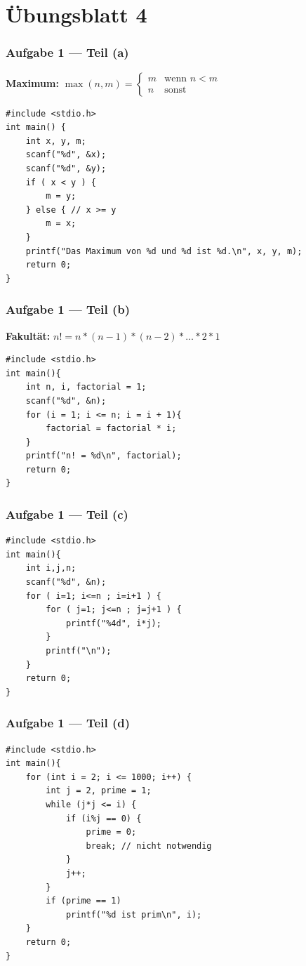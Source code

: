 \documentclass{beamer}
\newcommand*{\ttfamilywithbold}{\fontfamily{lmtt}\selectfont}
\begin{document}

\section{Übungsblatt 4}

\begin{frame}[fragile] \frametitle{Aufgabe 1 --- Teil (a)}
	\textbf{Maximum:} $\displaystyle \max(n,m) = \begin{cases}
		m & \text{wenn } n < m \\
		n & \text{sonst}
	\end{cases}$ \pause
	
	\vspace{\baselineskip}
	
	\begin{lstlisting}[style=frame, basicstyle=\ttfamilywithbold\footnotesize]
#include <stdio.h>
int main() {
	int x, y, m;
	scanf("%d", &x);
	scanf("%d", &y);
	if ( x < y ) {
		m = y;
	} else { // x >= y
		m = x;
	}
	printf("Das Maximum von %d und %d ist %d.\n", x, y, m);
	return 0;
}
	\end{lstlisting}
\end{frame}

\begin{frame}[fragile] \frametitle{Aufgabe 1 --- Teil (b)}
	\textbf{Fakultät:} $\displaystyle n! = n * (n-1) * (n-2) * \dots * 2 * 1$ \pause
	
\begin{lstlisting}[style=frame]
#include <stdio.h>
int main(){
	int n, i, factorial = 1;
	scanf("%d", &n);
	for (i = 1; i <= n; i = i + 1){
		factorial = factorial * i;
	}
	printf("n! = %d\n", factorial);
	return 0;
}
\end{lstlisting}
\end{frame}

\begin{frame}[fragile] \frametitle{Aufgabe 1 --- Teil (c)}
	\pause
	
	\begin{lstlisting}[style=frame]
#include <stdio.h>
int main(){
	int i,j,n;
	scanf("%d", &n);
	for ( i=1; i<=n ; i=i+1 ) {
		for ( j=1; j<=n ; j=j+1 ) {
			printf("%4d", i*j);
		}
		printf("\n");
	}
	return 0;
}
	\end{lstlisting}
\end{frame}


\begin{frame}[fragile] \frametitle{Aufgabe 1 --- Teil (d)}
	\pause
	
	\begin{lstlisting}[style=frame, basicstyle=\ttfamilywithbold\footnotesize]
#include <stdio.h>
int main(){
	for (int i = 2; i <= 1000; i++) {
		int j = 2, prime = 1;
		while (j*j <= i) {
			if (i%j == 0) {
				prime = 0;
				break; // nicht notwendig
			}
			j++;
		}
		if (prime == 1)
			printf("%d ist prim\n", i);
	}
	return 0;
}
	\end{lstlisting}
\end{frame}
\end{document}
